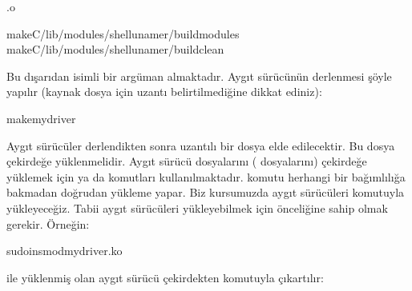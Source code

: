 \documentclass[a4paper,10pt,turkish]{sphinxmanual}
\begin{document}
\begin{sphinxVerbatim}[commandchars=\\\{\}]
.o

make\PYGZhy{}C/lib/modules/shelluname\PYGZhy{}r/buildmodules
make\PYGZhy{}C/lib/modules/shelluname\PYGZhy{}r/buildclean
\end{sphinxVerbatim}

\sphinxAtStartPar
Bu  dışarıdan  isimli bir argüman almaktadır. Aygıt sürücünün derlenmesi şöyle
yapılır (kaynak dosya için uzantı belirtilmediğine dikkat ediniz):

\begin{sphinxVerbatim}[commandchars=\\\{\}]
\PYGZdl{}makemydriver
\end{sphinxVerbatim}

\sphinxAtStartPar
Aygıt sürücüler derlendikten sonra  uzantılı bir dosya elde edilecektir. Bu dosya çekirdeğe
yüklenmelidir. Aygıt sürücü dosyalarını ( dosyalarını) çekirdeğe yüklemek için  ya da
 komutları kullanılmaktadır.  komutu herhangi bir bağımlılığa bakmadan doğrudan yükleme
yapar. Biz kursumuzda aygıt sürücüleri  komutuyla yükleyeceğiz. Tabii aygıt sürücüleri
yükleyebilmek için  önceliğine sahip olmak gerekir. Örneğin:

\begin{sphinxVerbatim}[commandchars=\\\{\}]
\PYGZdl{}sudoinsmodmydriver.ko
\end{sphinxVerbatim}

\sphinxAtStartPar
{} ile yüklenmiş olan aygıt sürücü çekirdekten  komutuyla çıkartılır:
\end{document}
